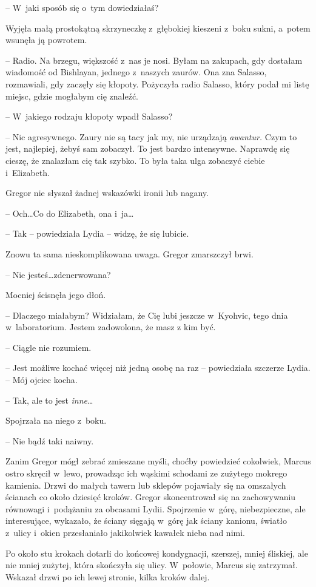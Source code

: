 \documentclass[oneside,polish,12pt,sfheadings]{mwbk}
\begin{document}
-- W~jaki sposób się o~tym dowiedziałaś?

Wyjęła małą prostokątną skrzyneczkę z~głębokiej kieszeni z~boku sukni, a~potem wsunęła ją powrotem.

-- Radio. Na brzegu, większość z~nas je nosi. Byłam na zakupach, gdy
dostałam wiadomość od Bishlayan, jednego z~naszych zaurów. Ona zna
Salasso, rozmawiali, gdy zaczęły się kłopoty. Pożyczyła radio Salasso,
który podał mi listę miejsc, gdzie mogłabym cię znaleźć.

-- W~jakiego rodzaju kłopoty wpadł Salasso?

-- Nic agresywnego. Zaury nie są tacy jak my, nie urządzają
\emph{awantur. } Czym to jest, najlepiej, żebyś sam zobaczył. To jest
bardzo intensywne. Naprawdę się cieszę, że znalazłam cię tak szybko. To
była taka ulga zobaczyć ciebie i~Elizabeth.

Gregor nie słyszał żadnej wskazówki ironii lub nagany.

-- Och\ldots Co do Elizabeth, ona i~ja\ldots

-- Tak -- powiedziała Lydia -- widzę, że się lubicie.

Znowu ta sama nieskomplikowana uwaga. Gregor zmarszczył brwi.

-- Nie jesteś\ldots zdenerwowana?

Mocniej ścisnęła jego dłoń. 

-- Dlaczego miałabym? Widziałam, że Cię lubi
jeszcze w~Kyohvic, tego dnia w~laboratorium. Jestem zadowolona, że masz
z kim być.

-- Ciągle nie rozumiem.

-- Jest możliwe kochać więcej niż jedną osobę na raz -- powiedziała
szczerze Lydia. -- Mój ojciec kocha.

-- Tak, ale to jest \emph{inne}\ldots

Spojrzała na niego z~boku. 

-- Nie bądź taki naiwny.

Zanim Gregor mógł zebrać zmieszane myśli, choćby powiedzieć cokolwiek,
Marcus ostro skręcił w~lewo, prowadząc ich wąskimi schodami ze zużytego
mokrego kamienia. Drzwi do małych tawern lub sklepów pojawiały się na
omszałych ścianach co około dziesięć kroków. Gregor skoncentrował się na
zachowywaniu równowagi i~podążaniu za obcasami Lydii. Spojrzenie w~górę,
niebezpieczne, ale interesujące, wykazało, że ściany sięgają w~górę jak
ściany kanionu, światło z~ulicy i~okien przesłaniało jakikolwiek kawałek
nieba nad nimi.

Po około stu krokach dotarli do końcowej kondygnacji, szerszej, mniej
śliskiej, ale nie mniej zużytej, która skończyła się ulicy. W~połowie,
Marcus się zatrzymał. Wskazał drzwi po ich lewej stronie, kilka kroków
dalej.
\end{document}

